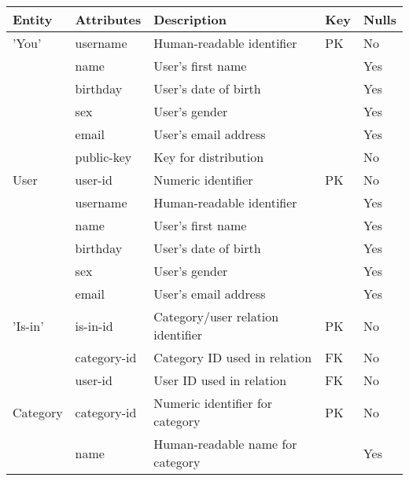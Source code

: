 
\begin{tabular}{lllll}

\toprule
    
    Entity & Attributes & Description & Key & Nulls \\

\midrule

    'You' & username      & Human-readable identifier         & PK & No  \\
          & name          & User's first name                 &    & Yes \\
          & birthday      & User's date of birth              &    & Yes \\
          & sex           & User's gender                     &    & Yes \\
          & email         & User's email address              &    & Yes \\
          & public-key    & Key for distribution              &    & No  \\

\midrule

    User  & user-id       & Numeric identifier                & PK & No  \\
          & username      & Human-readable identifier         &    & Yes \\ 
          & name          & User's first name                 &    & Yes \\
          & birthday      & User's date of birth              &    & Yes \\
          & sex           & User's gender                     &    & Yes \\
          & email         & User's email address              &    & Yes \\
          
\midrule

  'Is-in' & is-in-id      & Category/user relation identifier & PK & No  \\
          & category-id   & Category ID used in relation      & FK & No  \\
          & user-id       & User ID used in relation          & FK & No  \\
          
\midrule

Category & category-id & Numeric identifier for category     & PK & No  \\
         & name        & Human-readable name for category    &    & Yes \\


\end{tabular}
